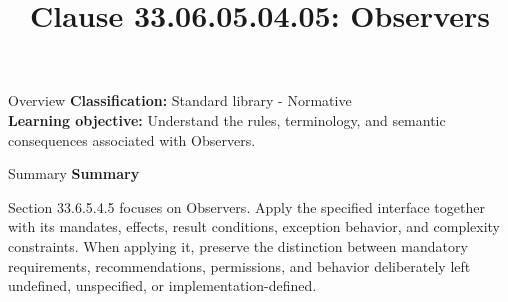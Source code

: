 \documentclass[10pt,letterpaper]{article}
\title{Clause 33.06.05.04.05: Observers}
\author{}
\date{}
\begin{document}
\maketitle
\begin{CornellOverviewBox}{Overview}
\textbf{Classification:} Standard library - Normative\\[2pt]
\textbf{Learning objective:} Understand the rules, terminology, and semantic consequences associated with Observers.
\end{CornellOverviewBox}\begin{CornellSummaryBox}{Summary}
{\sffamily\bfseries\color{Accent} Summary}\par\vspace{3pt}Section 33.6.5.4.5 focuses on Observers. Apply the specified interface together with its mandates, effects, result conditions, exception behavior, and complexity constraints. When applying it, preserve the distinction between mandatory requirements, recommendations, permissions, and behavior deliberately left undefined, unspecified, or implementation-defined.
\end{CornellSummaryBox}
\end{document}
